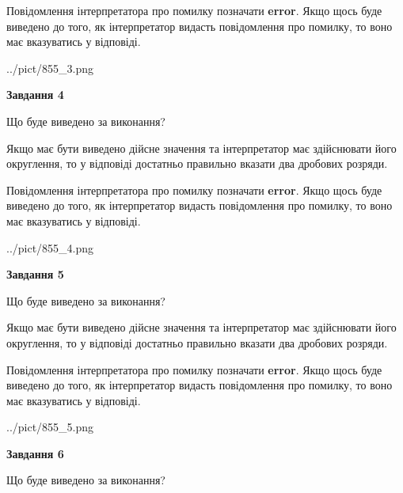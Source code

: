 \documentclass[12pt, ukrainian]{article}
\begin{document}
{\begin {Large}
Повідомлення інтерпретатора про помилку позначати \textbf{error}.
Якщо щось буде виведено до того, як інтерпретатор видасть повідомлення про помилку, 
то воно має вказуватись у відповіді. \par

\begin{center}
	{../pict/855_3.png}
\end{center}
\newpage

{\begin {center}\textbf{Завдання 4}\end {center}}\par
Що буде виведено за виконання? \par

Якщо має бути виведено дійсне значення та інтерпретатор має здійснювати його округлення, 
то у відповіді достатньо правильно вказати два дробових розряди.

Повідомлення інтерпретатора про помилку позначати \textbf{error}.
Якщо щось буде виведено до того, як інтерпретатор видасть повідомлення про помилку, 
то воно має вказуватись у відповіді. \par

\begin{center}
	{../pict/855_4.png}
\end{center}
\newpage

{\begin {center}\textbf{Завдання 5}\end {center}}\par
Що буде виведено за виконання? \par

Якщо має бути виведено дійсне значення та інтерпретатор має здійснювати його округлення, 
то у відповіді достатньо правильно вказати два дробових розряди.

Повідомлення інтерпретатора про помилку позначати \textbf{error}.
Якщо щось буде виведено до того, як інтерпретатор видасть повідомлення про помилку, 
то воно має вказуватись у відповіді. \par

\begin{center}
	{../pict/855_5.png}
\end{center}
\newpage

{\begin {center}\textbf{Завдання 6}\end {center}}\par
Що буде виведено за виконання? \par


\end{Large}}
\end{document}
